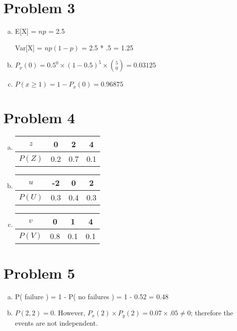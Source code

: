 \documentclass[11pt]{article}
\begin{document}
\section*{Problem 3}

\begin{enumerate}[(a)]
	\item E[X] = $np$ = 2.5
	
			Var[X] = $np(1-p)$ = 2.5 * .5 = 1.25
	\item $P_x(0) = 0.5^0 \times (1-0.5)^5 \times \binom{5}{0}	 = 0.03125$
	
	\item $P( x \geq 1  ) = 1 - P_x(0) = 0.96875$
	
\end{enumerate}

\section*{Problem 4}

\begin{enumerate}[(a)]
	\item 
		\begin{tabular}{ |c || c | c | c|}
			\hline
			$z$ & 0 & 2 & 4 \\
			\hline
			$P(Z)$ & 0.2 & 0.7 & 0.1 \\
			\hline
		\end{tabular}
		
	\item 
		\begin{tabular}{ |c || c | c | c|}
			\hline
			$u$ & -2 & 0 & 2 \\
			\hline
			$P(U)$ & 0.3 & 0.4 & 0.3 \\
			\hline
		\end{tabular}
		
	\item 
		\begin{tabular}{ |c || c | c | c|}
			\hline
			$v$ & 0 & 1 & 4 \\
			\hline
			$P(V)$ & 0.8 & 0.1 & 0.1 \\
			\hline
		\end{tabular}
\end{enumerate}


\section*{Problem 5}

\begin{enumerate}[(a)]
	\item P( failure ) = 1 - P( no failures ) = 1 - 0.52 = 0.48
	\item $P(2, 2) = 0$. However, $P_x(2) \times P_y(2) = 0.07 \times .05 \neq 0$; therefore the events are not independent.
\end{enumerate}
\end{document}
